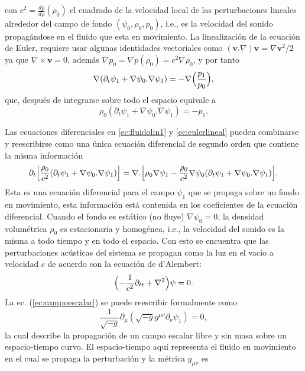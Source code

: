 con $ c^2=\frac{dp}{d \rho}(\rho_0)$ el cuadrado de la velocidad local de las perturbaciones lineales alrededor del campo de fondo $(\psi_0,\rho_0,p_0)$, i.e., es la velocidad del sonido propag\'{a}ndose en el fluido que esta en movimiento. La linealizaci\'{o}n de la ecuaci\'{o}n de Euler, requiere usar algunas identidades vectoriales como $(\textbf{v}.\nabla)\textbf{v}=\nabla \textbf{v}^2/2$ ya que $\nabla \times \textbf{v}=0$, adem\'{a}s $\nabla p_0=\nabla p(\rho_0)=c^2\nabla \rho_0$, y por tanto
\begin{equation}
\nabla(\partial_t \psi_1+ \nabla \psi_0.\nabla \psi_1)=-\nabla \Bigl(\frac{p_1}{p_0}\Bigr),
\end{equation}
que, despu\'{e}s de integrarse sobre todo el espacio equivale a
\begin{equation}\label{ec:eulerlineal}
\rho_0(\partial_t \psi_1+ \nabla \psi_0.\nabla \psi_1)=- p_1.
\end{equation}

Las ecuaciones diferenciales en \ref{ec:fluidolin1} y \ref{ec:eulerlineal} pueden combinarse y reescribirse como una \'{u}nica ecuaci\'{o}n diferencial de segundo orden que contiene la misma informaci\'{o}n
\begin{equation}\label{ec:campoescalar}
\partial_t\Bigl[\frac{\rho_0}{c^2}(\partial_t \psi_1+\nabla \psi_0 . \nabla \psi_1)\Bigr]=\nabla. \Bigl[\rho_0\nabla \psi_1-\frac{\rho_0}{c^2}\nabla \psi_0 (\partial_t \psi_1+\nabla \psi_0 . \nabla \psi_1)\Bigr].
\end{equation}
Esta es una ecuaci\'{o}n diferencial para el campo $\psi_1$ que se propaga sobre un fondo en movimiento, esta informaci\'{o}n est\'{a} contenida en los coeficientes de la ecuaci\'{o}n diferencial. Cuando el fondo es est\'{a}tico (no  fluye) $\nabla \psi_0=0$, la densidad volum\'{e}trica $\rho_0$ es estacionaria y homog\'{e}nea, i.e., la velocidad del sonido es la misma a todo tiempo y en todo el espacio. Con esto se encuentra que las perturbaciones acústicas del sistema se propagan como la luz en el vac\'{i}o a velocidad $c$ de acuerdo con la ecuación de d'Alembert:
\begin{equation}
\Bigl(-\frac{1}{c^2}\partial_{tt}+\nabla^2\Bigr)\psi=0.
\end{equation}
La ec. (\ref{ec:campoescalar}) se puede reescribir formalmente como
\begin{equation}
\frac{1}{\sqrt{-g}}\partial_{\mu}(\sqrt{-g}g^{\mu \nu}\partial_{\nu}\psi_1)=0,
\end{equation}
la cual describe la propagaci\'{o}n de un campo escalar libre y sin masa sobre un espacio-tiempo curvo. El espacio-tiempo aqu\'{i} representa el fluido en movimiento en el cual se propaga la perturbaci\'{o}n y la m\'{e}trica $g_{\mu \nu}$ es

